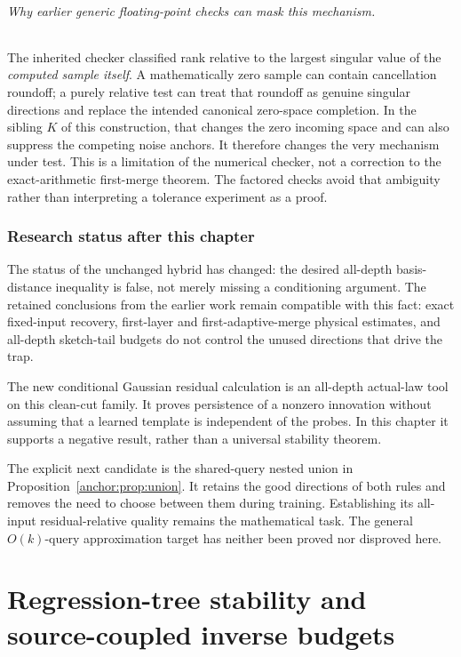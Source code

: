 \documentclass[11pt,oneside,openany,a4paper]{book}
\numberwithin{equation}{chapter}
\theoremstyle{definition}
\theoremstyle{remark}
\begin{document}
\paragraph{Why earlier generic floating-point checks can mask this mechanism.}
The inherited checker classified rank relative to the largest singular value of the \emph{computed sample itself}. A mathematically zero sample can contain cancellation roundoff; a purely relative test can treat that roundoff as genuine singular directions and replace the intended canonical zero-space completion. In the sibling $K$ of this construction, that changes the zero incoming space and can also suppress the competing noise anchors. It therefore changes the very mechanism under test. This is a limitation of the numerical checker, not a correction to the exact-arithmetic first-merge theorem. The factored checks avoid that ambiguity rather than interpreting a tolerance experiment as a proof.

\section*{Research status after this chapter}
The status of the unchanged hybrid has changed: the desired all-depth basis-distance inequality is false, not merely missing a conditioning argument. The retained conclusions from the earlier work remain compatible with this fact: exact fixed-input recovery, first-layer and first-adaptive-merge physical estimates, and all-depth sketch-tail budgets do not control the unused directions that drive the trap.

The new conditional Gaussian residual calculation is an all-depth actual-law tool on this clean-cut family. It proves persistence of a nonzero innovation without assuming that a learned template is independent of the probes. In this chapter it supports a negative result, rather than a universal stability theorem.

The explicit next candidate is the shared-query nested union in Proposition~\ref{anchor:prop:union}. It retains the good directions of both rules and removes the need to choose between them during training. Establishing its all-input residual-relative quality remains the mathematical task. The general $O(k)$-query approximation target has neither been proved nor disproved here.

\endgroup

\part{Regression-tree stability and source-coupled inverse budgets}
\end{document}
